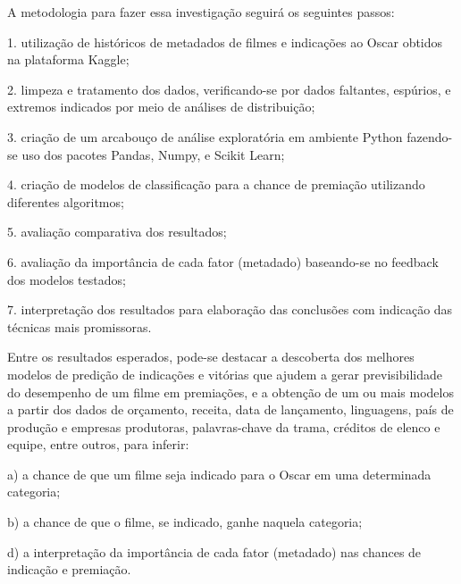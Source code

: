 A metodologia para fazer essa investigação seguirá os seguintes passos:\par

1. utilização de históricos de metadados de filmes e indicações ao Oscar obtidos na plataforma Kaggle;\par
2. limpeza e tratamento dos dados, verificando-se por dados faltantes, espúrios, e extremos indicados por meio de análises de distribuição;\par
3. criação de um arcabouço de análise exploratória em ambiente Python fazendo-se uso dos pacotes Pandas, Numpy, e Scikit Learn;\par
4. criação de modelos de classificação para a chance de premiação utilizando diferentes algoritmos;\par
5. avaliação comparativa dos resultados;\par
6. avaliação da importância de cada fator (metadado) baseando-se no feedback dos modelos testados;\par
7. interpretação dos resultados para elaboração das conclusões com indicação das técnicas mais promissoras.\par
\par

Entre os resultados esperados, pode-se destacar a descoberta dos melhores modelos de predição de indicações e vitórias que ajudem a gerar previsibilidade do desempenho de um filme em premiações, e a obtenção de um ou mais modelos a partir dos dados de orçamento, receita, data de lançamento, linguagens, país de produção e empresas produtoras, palavras-chave da trama, créditos de elenco e equipe, entre outros, para inferir:\par

a) a chance de que um filme seja indicado para o Oscar em uma determinada categoria;\par
b) a chance de que o filme, se indicado, ganhe naquela categoria;\par
d) a interpretação da importância de cada fator (metadado) nas chances de indicação e premiação.\par
